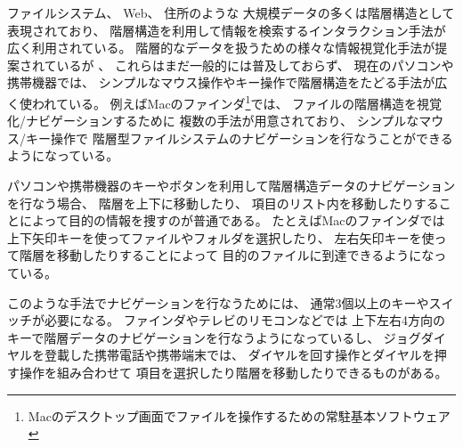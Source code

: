 \documentclass[twoside]{wiss}
\begin{document}
ファイルシステム、
Web、
住所のような
大規模データの多くは階層構造として表現されており、
%
%
%
%
%
%
%
階層構造を利用して情報を検索するインタラクション手法が広く利用されている。
階層的なデータを扱うための様々な情報視覚化手法が提案されているが
\cite{Johnson:1991:TSA:949607.949654}\cite{Lamping:1995:FTB:223904.223956}\cite{Stasko:2000:FDN:857190.857683}、
これらはまだ一般的には普及しておらず、
現在のパソコンや携帯機器では、
シンプルなマウス操作やキー操作で階層構造をたどる手法が広く使われている。
%
例えばMacのファインダ\footnote{
  Macのデスクトップ画面でファイルを操作するための常駐基本ソフトウェア
}では、
ファイルの階層構造を視覚化/ナビゲーションするために
複数の手法が用意されており、
シンプルなマウス/キー操作で
階層型ファイルシステムのナビゲーションを行なうことができるようになっている。



パソコンや携帯機器のキーやボタンを利用して階層構造データのナビゲーションを行なう場合、
階層を上下に移動したり、
項目のリスト内を移動したりすることによって目的の情報を捜すのが普通である。
たとえばMacのファインダでは
上下矢印キーを使ってファイルやフォルダを選択したり、
左右矢印キーを使って階層を移動したりすることによって
目的のファイルに到達できるようになっている。


このような手法でナビゲーションを行なうためには、
通常3個以上のキーやスイッチが必要になる。
%
ファインダやテレビのリモコンなどでは
上下左右4方向のキーで階層データのナビゲーションを行なうようになっているし、
ジョグダイヤルを登載した携帯電話や携帯端末では、
ダイヤルを回す操作とダイヤルを押す操作を組み合わせて
項目を選択したり階層を移動したりできるものがある。
\end{document}
